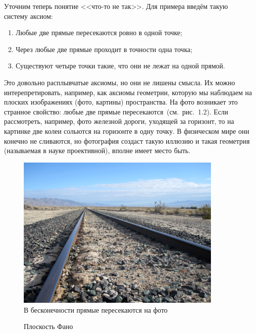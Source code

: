 Уточним теперь понятие <<что-то не так>>. Для примера введём такую систему аксиом:

\begin{enumerate}
\item Любые две прямые пересекаются ровно в одной точке;
\item Через любые две прямые проходит в точности одна точка;
\item Существуют четыре точки такие, что они не лежат на одной прямой.
\end{enumerate}

Это довольно расплывчатые аксиомы, но они не лишены смысла. Их можно интерепретировать, например, как аксиомы геометрии, которую мы наблюдаем на плоских изображениях (фото, картины) пространства. На фото возникает это странное свойство: любые две прямые пересекаются~(см.~рис.~1.2). Если рассмотреть, например, фото железной дороги, уходящей за горизонт, то на картинке две колеи сольются на горизонте в одну точку. В физическом мире они конечно не сливаются, но фотография создаст такую иллюзию и такая геометрия (называемая в науке проективной), вполне имеет место быть.

\begin{figure}[h]
\centering
\includegraphics[width=10cm]{images/parallels.png}
\caption{В бесконечности прямые пересекаются на фото}
\end{figure}

\begin{figure}[h]
\centering
{}
\caption{Плоскость Фано}
\end{figure}

